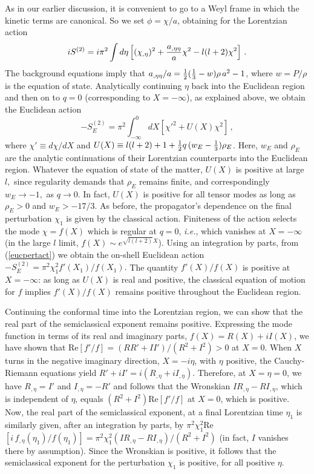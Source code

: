 \documentclass[twocolumn,amsmath,amssymb,superscriptaddress,nofootinbib]{revtex4-1}
\begin{document}
As in our earlier discussion, it is convenient to go to a Weyl frame in which the kinetic terms are canonical. So we set $\phi=\chi/a$, obtaining for the Lorentzian action
\begin{equation}
i S^{(2)}=i \pi^2 \int d\eta \left[(\chi_{,\eta})^2+{a_{,\eta\eta}\over a}\chi^2 -l(l+2)\chi^2\right] \,.
\end{equation}
The background equations imply that $a_{,\eta\eta}/ a= {1\over 2} ({1\over 3} - w) \rho \,a^2 -1$, where $w=P/\rho$ is the equation of state. Analytically continuing $\eta$ back into the Euclidean region and then on to $q=0$ (corresponding to $X=-\infty$), as explained above, we obtain the Euclidean action
\begin{equation}
-S_E^{(2)}=\pi^2 \int_{-\infty}^0 d X \left[\chi'^2+U(X) \chi^2\right]\,,
\label{eucpertact}
\end{equation}
where $\chi'\equiv d\chi/dX$ and $U(X)\equiv l(l+2)+1 +{1\over 2} q\,(w_E-{1\over 3}) \rho_E $.  Here, $w_E$ and $\rho_E$ are the analytic continuations of their Lorentzian counterparts into the Euclidean region. Whatever the equation of state of the matter, $U(X)$ is positive at large $l,$ since regularity demands that $\rho_E$ remains finite, and correspondingly $w_E \rightarrow -1,$ as $q\rightarrow 0$. In fact, $U(X)$ is positive for all tensor modes as long as $\rho_E>0$ and $w_E>-17/3$. As before, the propagator's dependence on the final perturbation $\chi_1$ is given by the classical action. Finiteness of the action selects the mode $\chi=f(X)$ which is regular at $q=0$, {\it i.e.}, which vanishes at $X=-\infty$ (in the large $l$ limit, $f(X) \sim e^{\sqrt{l(l+2)}X}$). Using an integration by parts, from (\ref{eucpertact}) we obtain the on-shell Euclidean action $-S^{(2)}_E=\pi^2 \chi_1^2 f'(X_1)/f(X_1).$ The quantity $f'(X)/f(X)$ is positive at $X=-\infty$: as long as $U(X)$ is real and positive, the classical equation of motion for  $f$ implies $f'(X)/f(X)$  remains positive throughout the Euclidean region.

Continuing the conformal time into the Lorentzian region, we can show that the real part of the semiclassical exponent remains positive. Expressing the mode function in terms of its real and imaginary parts, $f(X)=R(X)+i I(X)$, we have shown that Re$[f'/f]=(R R'+II')/(R^2+I^2)>0$ at $X=0$. When $X$ turns in the negative imaginary direction, $X=-i \eta$, with $\eta$ positive, the Cauchy-Riemann equations yield $R'+iI'=i({R}_{,\eta}+i{I}_{,\eta}).$ Therefore, at $X=\eta=0$, we have ${R}_{,\eta}=I'$ and ${I}_{,\eta}=-R'$ and follows that the Wronskian $I{R}_{,\eta}-R {I}_{,\eta}$, which is independent of $\eta$, equals $(R^2+I^2)$Re$[f'/f]$ at $X=0$, which is positive. 
 Now, the real part of the semiclassical exponent, at a final Lorentzian time $\eta_1$ is similarly given, after an integration by parts, by $\pi^2 \chi_1^2$Re$[i\,{f}_{,\eta}(\eta_1)/f(\eta_1)]= \pi^2 \chi_1^2 (I{R}_{,\eta}-R {I}_{,\eta})/(R^2+I^2)$ (in fact, $I$ vanishes there by assumption). Since the Wronskian is positive, it follows that the semiclassical exponent for the perturbation $\chi_1$ is positive, for all positive $\eta$. 
\end{document}
